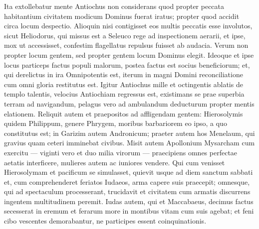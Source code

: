 \begin{biblechapter}
\begin{biblechapter}
\begin{biblechapter}
\begin{biblechapter}
\begin{biblechapter}
\verse Ita extollebatur mente Antiochus non considerans quod propter peccata habitantium civitatem modicum Dominus fuerat iratus; propter quod accidit circa locum despectio. 
\verse Alioquin nisi contigisset eos multis peccatis esse involutos, sicut Heliodorus, qui missus est a Seleuco rege ad inspectionem aerarii, et ipse, mox ut accessisset, confestim flagellatus repulsus fuisset ab audacia. 
\verse Verum non propter locum gentem, sed propter gentem locum Dominus elegit. 
\verse Ideoque et ipse locus particeps factus populi malorum, postea factus est socius beneficiorum; et, qui derelictus in ira Omnipotentis est, iterum in magni Domini reconciliatione cum omni gloria restitutus est.
 \verse Igitur Antiochus mille et octingentis ablatis de templo talentis, velocius Antiochiam regressus est, existimans se prae superbia terram ad navigandum, pelagus vero ad ambulandum deducturum propter mentis elationem. 
\verse Reliquit autem et praepositos ad affligendam gentem: Hierosolymis quidem Philippum, genere Phrygem, moribus barbariorem eo ipso, a quo constitutus est; 
\verse in Garizim autem Andronicum; praeter autem hos Menelaum, qui gravius quam ceteri imminebat civibus. 
\verse Misit autem Apollonium Mysarcham cum exercitu — viginti vero et duo milia virorum — praecipiens omnes perfectae aetatis interficere, mulieres autem ac iuniores vendere. 
\verse Qui cum venisset Hierosolymam et pacificum se simulasset, quievit usque ad diem sanctum sabbati et, cum comprehenderet feriatos Iudaeos, arma capere suis praecepit; 
\verse omnesque, qui ad spectaculum processerant, trucidavit et civitatem cum armatis discurrens ingentem multitudinem peremit. 
\verse Iudas autem, qui et Maccabaeus, decimus factus secesserat in eremum et ferarum more in montibus vitam cum suis agebat; et feni cibo vescentes demorabantur, ne participes essent coinquinationis.
 

\end{biblechapter}
\end{biblechapter}
\end{biblechapter}
\end{biblechapter}
\end{biblechapter}
